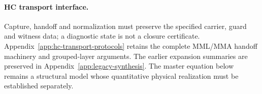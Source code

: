 


\paragraph{HC transport interface.}
Capture, handoff and normalization must preserve the specified carrier,
guard and witness data; a diagnostic state is not a closure certificate.
Appendix~\ref{app:hc-transport-protocols} retains the complete MML/MMA
handoff machinery and grouped-layer arguments. The earlier expansion
summaries are preserved in Appendix~\ref{app:legacy-synthesis}.
The master equation below remains a structural model whose quantitative
physical realization must be established separately.
